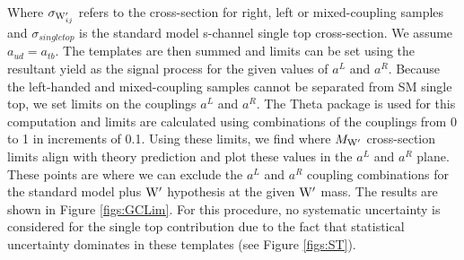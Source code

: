 Where $\sigma_{\mathrm{W}^\prime_{ij}}$ refers to the cross-section for right, left or mixed-coupling samples and $\sigma_{single top}$ is the 
standard model s-channel single top cross-section.
We assume $a_{ud} = a_{tb}$.  The templates are then summed and limits can be set 
using the resultant yield as the signal process for the given values of $a^L$ and $a^R$.
Because the left-handed and mixed-coupling samples cannot be separated from SM single top, we set limits on the couplings $a^L$ and $a^R$.
The Theta package is used for this computation and limits are calculated using combinations of the couplings from 0 to 1 in increments of 0.1.  Using these limits, we find where 
$M_{\mathrm{W}^\prime}$ cross-section limits align with theory prediction and plot these values in the $a^L$ and $a^R$ plane.  These points are where we can exclude the $a^L$ and $a^R$ coupling combinations 
for the standard model plus $\mathrm{W}^\prime$ hypothesis at the given $\mathrm{W}^\prime$ mass.  The results are shown in Figure \ref{figs:GCLim}.  For this procedure, no systematic uncertainty is considered for the single top contribution 
due to the fact that statistical uncertainty dominates in these templates (see Figure \ref{figs:ST}).  



